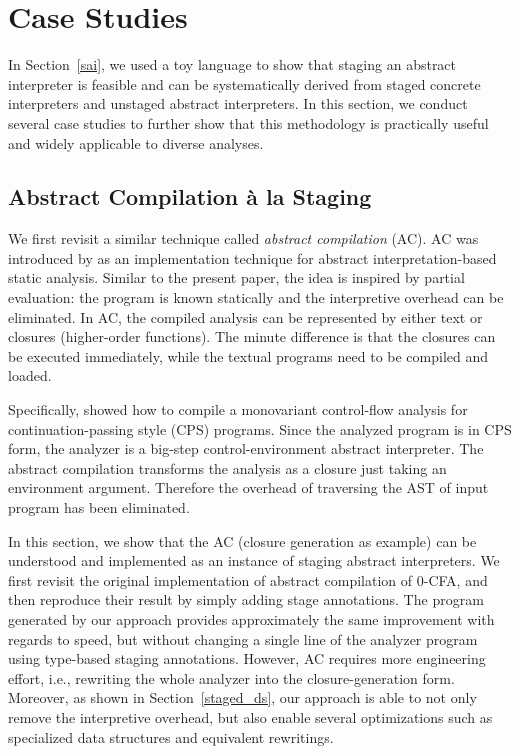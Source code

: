 \section{Case Studies} \label{cases_study}

In Section~\ref{sai}, we used a toy language to show that staging an abstract
interpreter is feasible and can be systematically derived from staged concrete
interpreters and unstaged abstract interpreters.
In this section, we conduct several case studies to further show that this
methodology is practically useful and widely applicable to diverse analyses.

\subsection{Abstract Compilation \`a la Staging} \label{cs_ac}

We first revisit a similar technique called \textit{abstract compilation} (AC).
AC was introduced by \citet{Boucher:1996:ACN:647473.727587} as an
implementation technique for abstract interpretation-based static analysis.
Similar to the present paper, the idea is inspired by partial evaluation:
the program is known statically and the interpretive overhead can be
eliminated. In AC, the compiled analysis can be represented by either text or
closures (higher-order functions). The minute difference is that the closures
can be executed immediately, while the textual programs need to be compiled and
loaded.

Specifically, \citeauthor{Boucher:1996:ACN:647473.727587} showed how to compile a
monovariant control-flow analysis \cite{Shivers:1991:SSC:115865.115884,
Shivers:1988:CFA:53990.54007} for continuation-passing style (CPS) programs.
Since the analyzed program is in CPS form, the analyzer is a big-step
control-environment abstract interpreter. The abstract compilation transforms
the analysis as a closure just taking an environment argument. Therefore the
overhead of traversing the AST of input program has been eliminated.

In this section, we show that the AC (closure generation as example) can be
understood and implemented as an instance of staging abstract interpreters. We
first revisit the original implementation of abstract compilation of 0-CFA, and
then reproduce their result by simply adding stage annotations.
The program generated by our approach provides approximately the same improvement with regards to
speed, but without changing a single line of the analyzer program using
type-based staging annotations. However, AC requires more engineering effort,
i.e., rewriting the whole analyzer into the closure-generation form. Moreover,
as shown in Section~\ref{staged_ds}, our approach is able to not only remove the
interpretive overhead, but also enable several optimizations such as specialized
data structures and equivalent rewritings.

